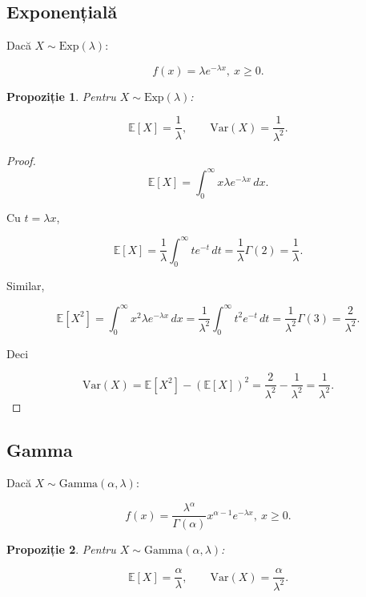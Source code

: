 \documentclass[12pt]{article}
\theoremstyle{plain}
\newtheorem{proposition}{Propoziție}
\begin{document}
\subsection{Exponențială}

Dacă $X \sim \mathrm{Exp}(\lambda)$:


\[
f(x) = \lambda e^{-\lambda x},\ x\ge0.
\]



\begin{proposition}
Pentru $X \sim \mathrm{Exp}(\lambda)$:


\[
\mathbb{E}[X] = \frac{1}{\lambda},\qquad
\mathrm{Var}(X) = \frac{1}{\lambda^2}.
\]


\end{proposition}

\begin{proof}


\[
\mathbb{E}[X] = \int_0^\infty x \lambda e^{-\lambda x}\,dx.
\]


Cu $t=\lambda x$,


\[
\mathbb{E}[X] = \frac{1}{\lambda}\int_0^\infty t e^{-t}\,dt = \frac{1}{\lambda}\Gamma(2) = \frac{1}{\lambda}.
\]


Similar,


\[
\mathbb{E}[X^2] = \int_0^\infty x^2 \lambda e^{-\lambda x}\,dx
= \frac{1}{\lambda^2}\int_0^\infty t^2 e^{-t}\,dt = \frac{1}{\lambda^2}\Gamma(3) = \frac{2}{\lambda^2}.
\]


Deci


\[
\mathrm{Var}(X) = \mathbb{E}[X^2] - (\mathbb{E}[X])^2
= \frac{2}{\lambda^2} - \frac{1}{\lambda^2} = \frac{1}{\lambda^2}.
\]


\end{proof}

\subsection{Gamma}

Dacă $X \sim \mathrm{Gamma}(\alpha,\lambda)$:


\[
f(x) = \frac{\lambda^\alpha}{\Gamma(\alpha)} x^{\alpha-1} e^{-\lambda x},\ x\ge0.
\]



\begin{proposition}
Pentru $X \sim \mathrm{Gamma}(\alpha,\lambda)$:


\[
\mathbb{E}[X] = \frac{\alpha}{\lambda},\qquad
\mathrm{Var}(X) = \frac{\alpha}{\lambda^2}.
\]


\end{proposition}
\end{document}
